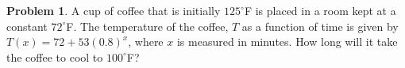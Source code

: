 \documentclass[12pt]{scrartcl}
\theoremstyle{definition}
\newtheorem{problem}[theorem]{Problem}
\begin{document}

%
%
%
%
%
%
%
%
%
%
%
%
%


\begin{problem}
	A cup of coffee that is initially $125^\circ$F is placed in a room kept at a constant $72^\circ$F. The temperature of the coffee, $T$ as a function of time is given by $T(x)=72+53(0.8)^x$, where $x$ is measured in minutes. How long will it take the coffee to cool to $100^\circ$F?
\end{problem}

\newpage
\end{document}
